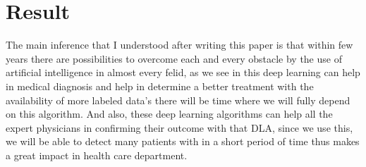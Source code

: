 \documentclass{article}
\begin{document}
\section*{Result  }


The main inference that I understood after writing this paper is that within few years there are possibilities to overcome each and every obstacle by the use of artificial intelligence in almost every felid, as we see in this deep learning can help in medical diagnosis and help in determine a better treatment with the availability of more labeled data's there will be time where we will fully depend on this algorithm. And also, these deep learning algorithms can help all the expert physicians in confirming their outcome with that DLA, since we use this, we will be able to detect many patients with in a short period of time thus makes a great impact in health care department. 
\end{document}
